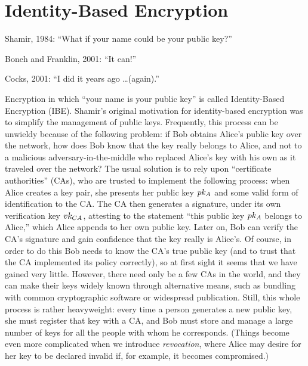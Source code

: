 \documentclass[11pt]{article}
\begin{document}
\thispagestyle{fancy} %


\section{Identity-Based Encryption}
\label{sec:ident-based-encrypt}

Shamir, 1984: ``What if your name could be your public key?''

\medskip
\noindent Boneh and Franklin, 2001: ``It can!''

\medskip
\noindent Cocks, 2001: ``I did it years ago \ldots (again).''

\bigskip

Encryption in which ``your name is your public key'' is called
Identity-Based Encryption (IBE).  Shamir's original motivation for
identity-based encryption was to simplify the management of public
keys.  Frequently, this process can be unwieldy because of the
following problem: if Bob obtains Alice's public key over the network,
how does Bob know that the key really belongs to Alice, and not to a
malicious adversary-in-the-middle who replaced Alice's key with his
own as it traveled over the network?  The usual solution is to rely
upon ``certificate authorities'' (CAs), who are trusted to implement
the following process: when Alice creates a key pair, she presents her
public key $pk_{A}$ and some valid form of identification to the CA.
The CA then generates a signature, under its own verification key
$vk_{CA}$, attesting to the statement ``this public key $pk_{A}$
belongs to Alice,'' which Alice appends to her own public key.  Later
on, Bob can verify the CA's signature and gain confidence that the key
really is Alice's.  Of course, in order to do this Bob needs to know
the CA's true public key (and to trust that the CA implemented its
policy correctly), so at first sight it seems that we have gained very
little.  However, there need only be a few CAs in the world, and they
can make their keys widely known through alternative means, such as
bundling with common cryptographic software or widespread publication.
Still, this whole process is rather heavyweight: every time a person
generates a new public key, she must register that key with a CA, and
Bob must store and manage a large number of keys for all the people
with whom he corresponds.  (Things become even more complicated when
we introduce \emph{revocation}, where Alice may desire for her key to
be declared invalid if, for example, it becomes compromised.)
\end{document}
